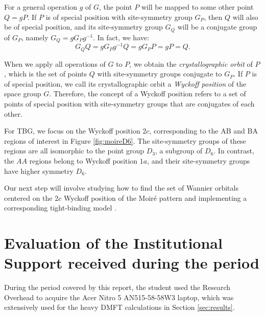 \documentclass[12pt]{report}
\begin{document}
For a general operation $g$ of $G$, the point $P$ will be mapped to some other point $Q = g P$. If $P$ is of special position with site-symmetry group $G_P$, then $Q$ will also be of special position, and its site-symmetry group $G_Q$ will be a conjugate group of $G_P$, namely $G_Q = g G_P g^{-1}$. In fact, we have:
\begin{equation} \label{eq:special-position}
G_Q Q = g G_P g^{-1} Q = g G_P P = g P = Q.
\end{equation}

When we apply all operations of $G$ to $P$, we obtain the \textit{crystallographic orbit} of $P$, which is the set of points $Q$ with site-symmetry groups conjugate to $G_P$. If $P$ is of special position, we call its crystallographic orbit a \textit{Wyckoff position} of the space group $G$. Therefore, the concept of a Wyckoff position refers to a set of points of special position with site-symmetry groups that are conjugates of each other.

\n

For TBG, we focus on the Wyckoff position $2c$, corresponding to the AB and BA regions of interest in Figure \ref{fig:moireD6}. The site-symmetry groups of these regions are all isomorphic to the point group $D_3$, a subgroup of $D_6$. In contrast, the $AA$ regions belong to Wyckoff position $1a$, and their site-symmetry groups have higher symmetry $D_6$.

Our next step will involve studying how to find the set of Wannier orbitals centered on the $2c$ Wyckoff position of the Moiré pattern and implementing a corresponding tight-binding model \cite{thesis_rennella}.


\pagebreak


\chapter{Evaluation of the Institutional Support received during the period} \label{chp:apoioInst}

During the period covered by this report, the student used the Research Overhead to acquire the Acer Nitro 5 AN515-58-58W3 laptop, which was extensively used for the heavy DMFT calculations in Section \ref{sec:results}.
\end{document}

